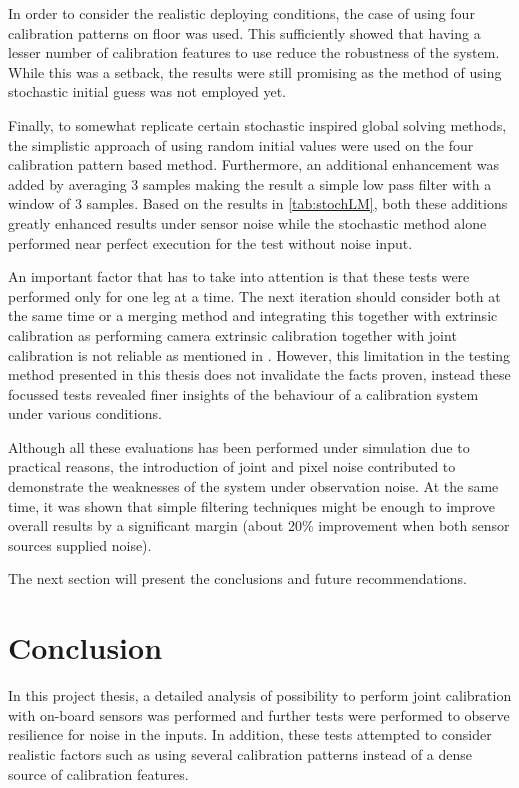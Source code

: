 \documentclass[english, printversion, nomenclature, notitle]{tuvisionthesis} %
\begin{document}
In order to consider the realistic deploying conditions, the case of using four calibration patterns on floor was used. This sufficiently showed that having a lesser number of calibration features to use reduce the robustness of the system. While this was a setback, the results were still promising as the method of using stochastic initial guess was not employed yet.

Finally, to somewhat replicate certain stochastic inspired global solving methods, the simplistic approach of using random initial values were used on the four calibration pattern based method. Furthermore, an additional enhancement was added by averaging 3 samples making the result a simple low pass filter with a window of 3 samples. Based on the results in \cref{tab:stochLM}, both these additions greatly enhanced results under sensor noise while the stochastic method alone performed near perfect execution for the test without noise input.

An important factor that has to take into attention is that these tests were performed only for one leg at a time. The next iteration should consider both at the same time or a merging method and integrating this together with extrinsic calibration as performing camera extrinsic calibration together with joint calibration is not reliable as mentioned in \cite{hutchison_automatic_2015}. However, this limitation in the testing method presented in this thesis does not invalidate the facts proven, instead these focussed tests revealed finer insights of the behaviour of a calibration system under various conditions.

Although all these evaluations has been performed under simulation due to practical reasons, the introduction of joint and pixel noise contributed to demonstrate the weaknesses of the system under observation noise. At the same time, it was shown that simple filtering techniques might be enough to improve overall results by a significant margin (about 20\% improvement when both sensor sources supplied noise).

The next section will present the conclusions and future recommendations.

\chapter{Conclusion}

In this project thesis, a detailed analysis of possibility to perform joint calibration with on-board sensors was performed and further tests were performed to observe resilience for noise in the inputs. In addition, these tests attempted to consider realistic factors such as using several calibration patterns instead of a dense source of calibration features. 
\end{document}
